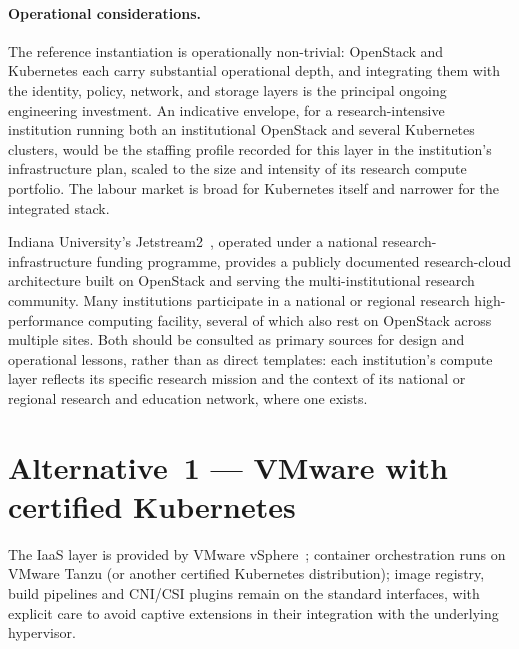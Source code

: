 \paragraph{Operational considerations.} The reference instantiation
is operationally non-trivial: OpenStack and Kubernetes each carry
substantial operational depth, and integrating them with the
identity, policy, network, and storage layers is the principal
ongoing engineering investment. An indicative envelope, for a
research-intensive institution running both an institutional
OpenStack and several Kubernetes clusters, would be the staffing
profile recorded for this layer in the institution's
infrastructure plan, scaled to the size and intensity of its
research compute portfolio. The labour market is broad
for Kubernetes itself and narrower for the integrated stack.

\begin{realworldbox}
\noindent Indiana University's Jetstream2~\cite{jetstream2-2021},
operated under a national research-infrastructure funding programme,
provides a publicly documented research-cloud architecture built on
OpenStack and serving the multi-institutional research community.
Many institutions participate in a national or regional research
high-performance computing facility, several of which also rest on
OpenStack across multiple sites. Both should be
consulted as primary sources for design and operational lessons,
rather than as direct templates: each institution's compute layer
reflects its specific research mission and the context of its
national or regional research and education network, where one exists.
\end{realworldbox}

\section{Alternative~1 --- VMware with certified Kubernetes}
\label{sec:co-alt1}

\begin{alternativebox}
\noindent The IaaS layer is provided by VMware vSphere~\cite{vmware-vsphere}; container
orchestration runs on VMware Tanzu (or another certified Kubernetes
distribution); image registry, build pipelines and CNI/CSI plugins
remain on the standard interfaces, with explicit care to avoid
captive extensions in their integration with the underlying
hypervisor.
\end{alternativebox}

